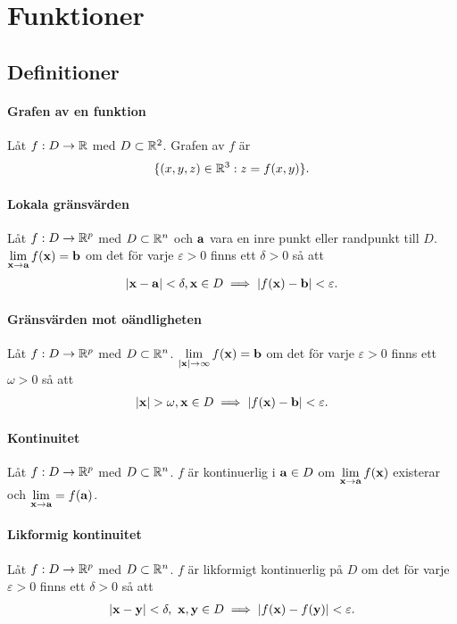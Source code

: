 \section{Funktioner}

\subsection{Definitioner}

\paragraph{Grafen av en funktion}
Låt $f: D\to\mathbb{R}$ med $D\subset\mathbb{R}^2$. Grafen av $f$ är
\begin{align*}
	\{(x, y, z)\in\mathbb{R}^3: z = f(x, y)\}.
\end{align*}

\paragraph{Lokala gränsvärden}
Låt $f: D\to\mathbb{R}^p$ med $D\subset\mathbb{R}^n$ och $\vb{a}$ vara en inre punkt eller randpunkt till $D$. $\lim\limits_{\vb{x}\to \vb{a}}f(\vb{x}) = \vb{b}$ om det för varje $\varepsilon > 0$ finns ett $\delta > 0$ så att
\begin{align*}
	\abs{\vb{x} - \vb{a}} < \delta, \vb{x}\in D \implies\abs{f(\vb{x}) - \vb{b}} < \varepsilon.
\end{align*}

\paragraph{Gränsvärden mot oändligheten}
Låt $f: D\to\mathbb{R}^p$ med $D\subset\mathbb{R}^n$. $\lim\limits_{\abs{\vb{x}}\to \infty}f(\vb{x}) = \vb{b}$ om det för varje $\varepsilon > 0$ finns ett $\omega > 0$ så att
\begin{align*}
	\abs{\vb{x}} > \omega, \vb{x}\in D \implies\abs{f(\vb{x}) - \vb{b}} < \varepsilon.
\end{align*}

\paragraph{Kontinuitet}
Låt $f: D\to\mathbb{R}^p$ med $D\subset\mathbb{R}^n$. $f$ är kontinuerlig i $\vb{a}\in D$ om $\lim\limits_{\vb{x}\to \vb{a}}f(\vb{x})$ existerar och $\lim\limits_{\vb{x}\to \vb{a}} = f(\vb{a})$.

\paragraph{Likformig kontinuitet}
Låt $f: D\to\mathbb{R}^p$ med $D\subset\mathbb{R}^n$. $f$ är likformigt kontinuerlig på $D$ om det för varje $\varepsilon > 0$ finns ett $\delta > 0$ så att
\begin{align*}
	\abs{\vb{x} - \vb{y}} < \delta,\ \vb{x}, \vb{y}\in D \implies\abs{f(\vb{x}) - f(\vb{y})} < \varepsilon.
\end{align*}

